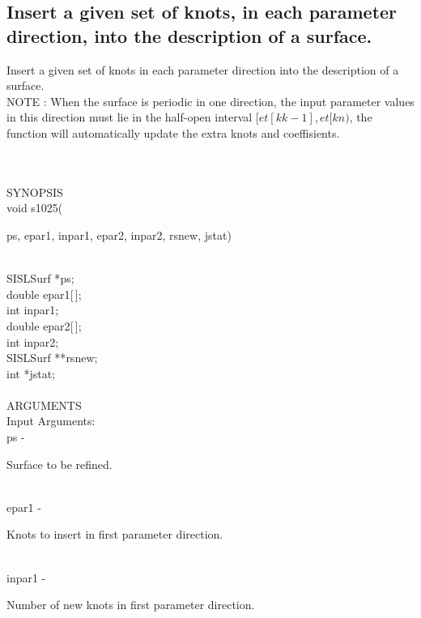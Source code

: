 \subsection{Insert a given set of knots, in each parameter direction, into the description of a surface.}
\begin{minipg1}
  Insert a given set of knots in each parameter direction
  into the description of a surface.\\
  NOTE       : When the surface is periodic in one direction, the input
               parameter values in this direction
               must lie in the half-open interval $[et[kk-1], et[kn)$, the function
               will automatically update the extra knots and
               coeffisients.
\end{minipg1} \\ \\
SYNOPSIS\\
        \>void s1025(\begin{minipg3}
          {\fov ps},  {\fov epar1},  {\fov inpar1},  {\fov epar2},  {\fov inpar2},  {\fov rsnew},  {\fov jstat})
        \end{minipg3}\\[0.3ex]
        \>\>    SISLSurf \> *{\fov ps};\\
        \>\>    double   \> {\fov epar1}[\,];\\
        \>\>    int      \> {\fov inpar1};\\
        \>\>    double   \> {\fov epar2}[\,];\\
        \>\>    int      \> {\fov inpar2};\\
        \>\>    SISLSurf \> **{\fov rsnew};\\
        \>\>    int      \> *{\fov jstat};\\
\\
ARGUMENTS\\
        \>Input Arguments:\\
        \>\>    {\fov ps}\> - \>  \begin{minipg2}
                     Surface to be refined.
                               \end{minipg2}\\
        \>\>    {\fov epar1}\> - \>  \begin{minipg2}
                     Knots to insert in first parameter direction.
                               \end{minipg2}\\
        \>\>    {\fov inpar1}\> - \>  \begin{minipg2}
                     Number of new knots in first parameter direction.
                               \end{minipg2}\\

